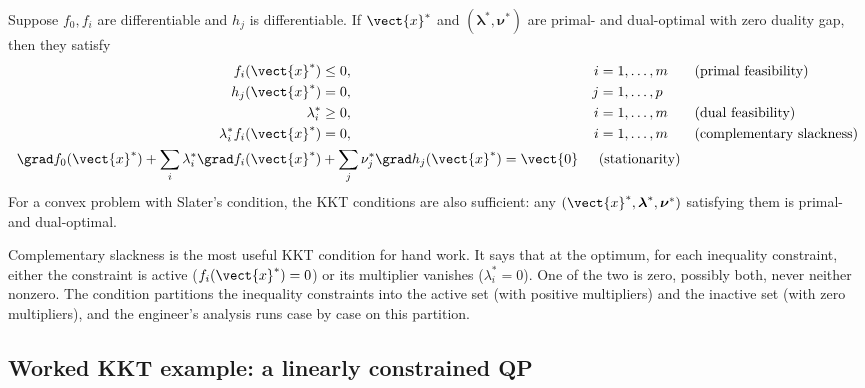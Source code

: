 \begin{theorem}
Suppose $f_{0}, f_{i}$ are differentiable and $h_{j}$ is
differentiable. If $\vect{x}^{*}$ and $(\boldsymbol{\lambda}^{*},
\boldsymbol{\nu}^{*})$ are primal- and dual-optimal with zero
duality gap, then they satisfy
\begin{align*}
f_{i}(\vect{x}^{*}) &\leq 0, & i &= 1, \ldots, m
&& \text{(primal feasibility)} \\
h_{j}(\vect{x}^{*}) &= 0, & j &= 1, \ldots, p \\
\lambda_{i}^{*} &\geq 0, & i &= 1, \ldots, m
&& \text{(dual feasibility)} \\
\lambda_{i}^{*} f_{i}(\vect{x}^{*}) &= 0, & i &= 1, \ldots, m
&& \text{(complementary slackness)} \\
\grad f_{0}(\vect{x}^{*}) + \sum_{i} \lambda_{i}^{*} \grad
f_{i}(\vect{x}^{*}) &+ \sum_{j} \nu_{j}^{*} \grad
h_{j}(\vect{x}^{*}) = \vect{0}
&& \text{(stationarity)}
\end{align*}
For a convex problem with Slater's condition, the KKT conditions
are also sufficient: any $(\vect{x}^{*}, \boldsymbol{\lambda}^{*},
\boldsymbol{\nu}^{*})$ satisfying them is primal- and dual-optimal.
\end{theorem}

Complementary slackness is the most useful KKT condition for
hand work. It says that at the optimum, for each inequality
constraint, either the constraint is active ($f_{i}(\vect{x}^{*})
= 0$) or its multiplier vanishes ($\lambda_{i}^{*} = 0$). One of
the two is zero, possibly both, never neither nonzero. The
condition partitions the inequality constraints into the active
set (with positive multipliers) and the inactive set (with zero
multipliers), and the engineer's analysis runs case by case on
this partition.

\subsection{Worked KKT example: a linearly constrained QP}

